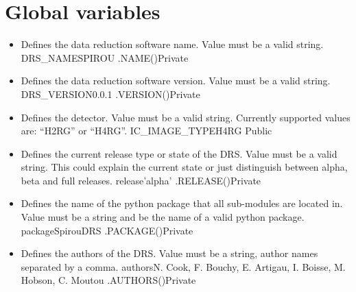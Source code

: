 \fi





\section{Global variables}
\label{ch:variables:global}


\begin{itemize}
\ifdevguide
\item {} 
{Defines the data reduction software name. Value must be a valid string.}
{DRS\_NAME}{SPIROU}
{\AllRecipes}{\spirouConst.NAME()}{\AllRecipes}{Private}
\fi

\ifdevguide
\item {} 
{Defines the data reduction software version. Value must be a valid string.}
{DRS\_VERSION}{0.0.1}
{\AllRecipes}{\spirouConst.VERSION()}{\AllRecipes}{Private}
\fi


\item {} 
{Defines the detector. Value must be a valid string. Currently supported values are: ``H2RG'' or ``H4RG''.}
{IC\_IMAGE\_TYPE}{H4RG}
{\AllRecipes}{\constantsfile}{\AllRecipes}{Public}


\ifdevguide
\item {}
{Defines the current release type or state of the DRS. Value must be a valid string. This could explain the current state or just distinguish between alpha, beta and full releases.}
{release}{'alpha'}
{\AllRecipes}{\spirouConst.RELEASE()}{\AllRecipes}{Private}
\fi

\ifdevguide
\item {}
{Defines the name of the python package that all sub-modules are located in. Value must be a string and be the name of a valid python package.}
{package}{SpirouDRS}
{\AllRecipes}{\spirouConst.PACKAGE()}{\AllRecipes}{Private}
\fi

\ifdevguide
\item {}
{Defines the authors of the DRS. Value must be a string, author names separated by a comma.}
{authors}{N. Cook, F. Bouchy, E. Artigau, I. Boisse, M. Hobson, C. Moutou}
{\AllRecipes}{\spirouConst.AUTHORS()}{\AllRecipes}{Private}
\fi



\end{itemize}
